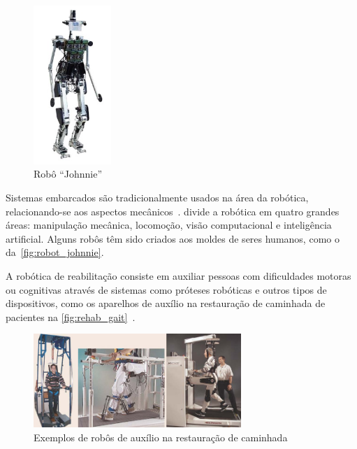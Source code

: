 \begin{figure}[!ht]
	\caption{\label{fig:robot_johnnie}Robô ``Johnnie''}
	\begin{center}
	    \includegraphics[height=6cm]{resources/robotics_robot_marwedel}
	\end{center}
\end{figure}

Sistemas embarcados são tradicionalmente usados na área da robótica, relacionando-se aos aspectos mecânicos~\cite{marwedel:2010}.  divide a robótica em quatro grandes áreas: manipulação mecânica, locomoção, visão computacional e inteligência artificial. Alguns robôs têm sido criados aos moldes de seres humanos, como o da~\autoref{fig:robot_johnnie}.

A robótica de reabilitação consiste em auxiliar pessoas com dificuldades motoras ou cognitivas através de sistemas como próteses robóticas e outros tipos de dispositivos, como os aparelhos de auxílio na restauração de caminhada de pacientes na \autoref{fig:rehab_gait}~\cite{siciliano:2008springer}. 

\begin{figure}[ht]
	\caption{\label{fig:rehab_gait}Exemplos de robôs de auxílio na restauração de caminhada}
	\begin{center}
	    \includegraphics[width=0.7\textwidth]{resources/robotics_rehab_1}
	\end{center}
\end{figure}

